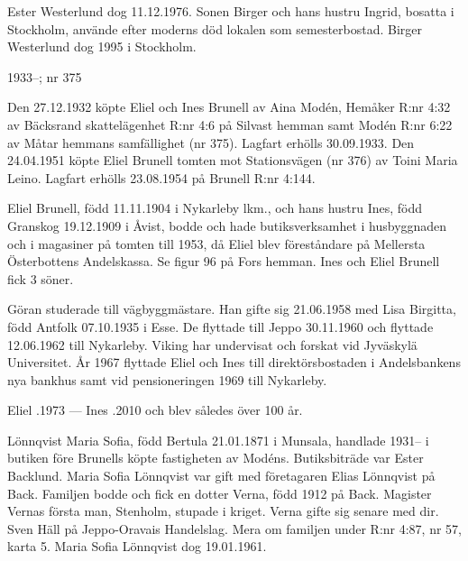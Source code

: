 Ester Westerlund dog 11.12.1976. Sonen Birger och hans hustru Ingrid, bosatta i Stockholm, använde efter moderns död lokalen som semesterbostad. Birger Westerlund dog 1995 i Stockholm.



 1933--; nr 375

Den 27.12.1932 köpte Eliel och Ines Brunell av Aina Modén, Hemåker R:nr 4:32 av Bäcksrand skattelägenhet R:nr 4:6 på Silvast hemman samt Modén R:nr 6:22 av Måtar hemmans samfällighet (nr 375). Lagfart erhölls 30.09.1933. Den 24.04.1951 köpte Eliel Brunell tomten mot Stationsvägen (nr 376) av Toini Maria Leino. Lagfart erhölls 23.08.1954 på Brunell R:nr 4:144.

Eliel Brunell, född 11.11.1904 i Nykarleby lkm., och hans hustru Ines, född Granskog 19.12.1909 i Åvist, bodde och hade butiksverksamhet i husbyggnaden och i magasiner på tomten till 1953, då Eliel blev föreståndare på Mellersta Österbottens Andelskassa. Se figur 96 på Fors hemman. Ines och Eliel Brunell fick 3 söner.


\begin{jhchildren}
  \item {}
  \item {}
  \item {}
\end{jhchildren}

Göran studerade till vägbyggmästare. Han gifte sig 21.06.1958 med Lisa Birgitta, född Antfolk 07.10.1935 i Esse. De flyttade till Jeppo 30.11.1960 och flyttade 12.06.1962 till Nykarleby. Viking har undervisat och forskat vid Jyväskylä Universitet. År 1967 flyttade Eliel och Ines till direktörsbostaden i Andelsbankens nya bankhus samt vid pensioneringen 1969 till Nykarleby.

Eliel .1973  --- Ines .2010 och blev således över 100 år.


Lönnqvist Maria Sofia, född Bertula 21.01.1871 i Munsala, handlade 1931-- i butiken före Brunells köpte fastigheten av Modéns. Butiksbiträde var Ester Backlund. Maria Sofia Lönnqvist var gift med företagaren Elias Lönnqvist på Back. Familjen bodde och fick en dotter Verna, född 1912 på Back. Magister Vernas första man, Stenholm, stupade i kriget. Verna gifte sig senare med dir. Sven Häll på Jeppo-Oravais Handelslag. Mera om familjen under R:nr 4:87, nr 57, karta 5. Maria Sofia Lönnqvist dog 19.01.1961.


